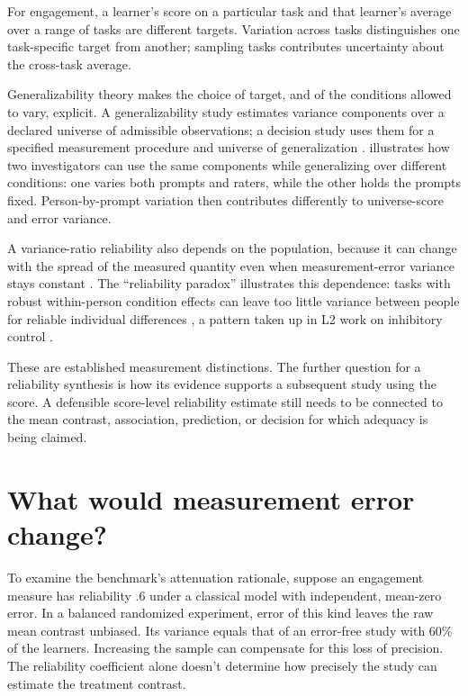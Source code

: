 \documentclass[12pt,twoside]{article}
\begin{document}
For engagement, a learner's score on a particular task and that learner's average over a range of tasks are different targets. Variation across tasks distinguishes one task-specific target from another; sampling tasks contributes uncertainty about the cross-task average.

Generalizability theory makes the choice of target, and of the conditions allowed to vary, explicit. A generalizability study estimates variance components over a declared universe of admissible observations; a decision study uses them for a specified measurement procedure and universe of generalization \citep[pp.\ 5--9]{brennan2001generalizability}. \textcite[p.\ 14]{brennan2001generalizability} illustrates how two investigators can use the same components while generalizing over different conditions: one varies both prompts and raters, while the other holds the prompts fixed. Person-by-prompt variation then contributes differently to universe-score and error variance.

A variance-ratio reliability also depends on the population, because it can change with the spread of the measured quantity even when measurement-error variance stays constant \citep[p.\ 24]{Hallgren2012}. The \enquote{reliability paradox} illustrates this dependence: tasks with robust within-person condition effects can leave too little variance between people for reliable individual differences \citep{HedgePowellSumner2018}, a pattern taken up in L2 work on inhibitory control \citep{WuJiaHui2025}.

These are established measurement distinctions. The further question for a reliability synthesis is how its evidence supports a subsequent study using the score. A defensible score-level reliability estimate still needs to be connected to the mean contrast, association, prediction, or decision for which adequacy is being claimed.

\section{What would measurement error change?}

To examine the benchmark's attenuation rationale, suppose an engagement measure has reliability .6 under a classical model with independent, mean-zero error. In a balanced randomized experiment, error of this kind leaves the raw mean contrast unbiased. Its variance equals that of an error-free study with 60\% of the learners. Increasing the sample can compensate for this loss of precision. The reliability coefficient alone doesn't determine how precisely the study can estimate the treatment contrast.
\end{document}
